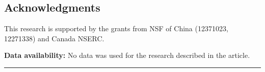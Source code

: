 \documentclass{book}
\theoremstyle{remark}
\begin{document}
\begin{multicols}{2}
\section{Acknowledgments}
This research is supported by the grants from NSF of China (12371023, 12271338) and Canada NSERC.

{\bf Data availability:} No data was used for the research described in the article.

\parskip=5pt
\noindent \rule[0pt]{25em}{1pt}

\parskip=10pt

\renewcommand{\bibname}{}

\vspace{-60pt}

\let\clearpage\relax



\end{multicols}
\end{document}
